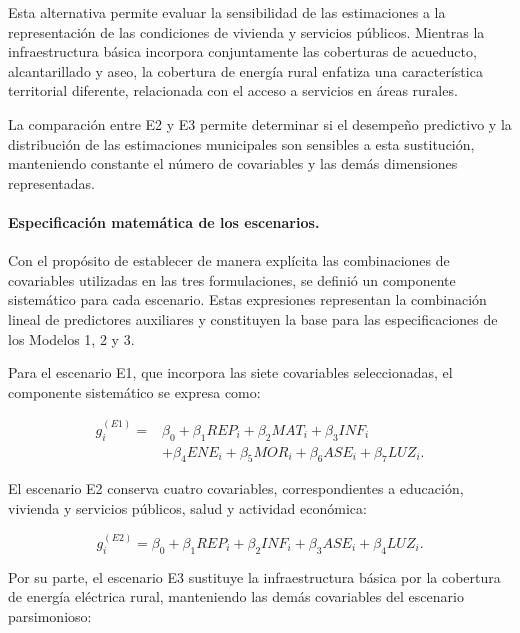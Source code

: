 Esta alternativa permite evaluar la sensibilidad de las estimaciones a la representación de las condiciones de vivienda y servicios públicos. Mientras la infraestructura básica incorpora conjuntamente las coberturas de acueducto, alcantarillado y aseo, la cobertura de energía rural enfatiza una característica territorial diferente, relacionada con el acceso a servicios en áreas rurales.

La comparación entre E2 y E3 permite determinar si el desempeño predictivo y la distribución de las estimaciones municipales son sensibles a esta sustitución, manteniendo constante el número de covariables y las demás dimensiones representadas.

\paragraph{Especificación matemática de los escenarios.}

Con el propósito de establecer de manera explícita las combinaciones de covariables utilizadas en las tres formulaciones, se definió un componente sistemático para cada escenario. Estas expresiones representan la combinación lineal de predictores auxiliares y constituyen la base para las especificaciones de los Modelos 1, 2 y 3.

Para el escenario E1, que incorpora las siete covariables seleccionadas, el componente sistemático se expresa como:

\begin{equation}
\begin{aligned}
g_i^{(E1)} = {} & \beta_0
+ \beta_1 REP_i
+ \beta_2 MAT_i
+ \beta_3 INF_i \\
& + \beta_4 ENE_i
+ \beta_5 MOR_i
+ \beta_6 ASE_i
+ \beta_7 LUZ_i.
\end{aligned}
\label{eq:escenario-e1}
\end{equation}

El escenario E2 conserva cuatro covariables, correspondientes a educación, vivienda y servicios públicos, salud y actividad económica:

\begin{equation}
g_i^{(E2)}
= \beta_0
+ \beta_1 REP_i
+ \beta_2 INF_i
+ \beta_3 ASE_i
+ \beta_4 LUZ_i.
\label{eq:escenario-e2}
\end{equation}

Por su parte, el escenario E3 sustituye la infraestructura básica por la cobertura de energía eléctrica rural, manteniendo las demás covariables del escenario parsimonioso:

